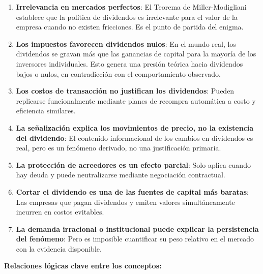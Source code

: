 \documentclass[12pt]{article}
\begin{document}
\begin{enumerate}
  \item \textbf{Irrelevancia en mercados perfectos}: El Teorema de Miller-Modigliani establece que la pol\'itica de dividendos es irrelevante para el valor de la empresa cuando no existen fricciones. Es el punto de partida del enigma.

  \item \textbf{Los impuestos favorecen dividendos nulos}: En el mundo real, los dividendos se gravan m\'as que las ganancias de capital para la mayor\'ia de los inversores individuales. Esto genera una presi\'on te\'orica hacia dividendos bajos o nulos, en contradicci\'on con el comportamiento observado.

  \item \textbf{Los costos de transacci\'on no justifican los dividendos}: Pueden replicarse funcionalmente mediante planes de recompra autom\'atica a costo y eficiencia similares.

  \item \textbf{La se\~nalizaci\'on explica los movimientos de precio, no la existencia del dividendo}: El contenido informacional de los cambios en dividendos es real, pero es un fen\'omeno derivado, no una justificaci\'on primaria.

  \item \textbf{La protecci\'on de acreedores es un efecto parcial}: Solo aplica cuando hay deuda y puede neutralizarse mediante negociaci\'on contractual.

  \item \textbf{Cortar el dividendo es una de las fuentes de capital m\'as baratas}: Las empresas que pagan dividendos y emiten valores simult\'aneamente incurren en costos evitables.

  \item \textbf{La demanda irracional o institucional puede explicar la persistencia del fen\'omeno}: Pero es imposible cuantificar su peso relativo en el mercado con la evidencia disponible.
\end{enumerate}

\bigskip
\noindent\textbf{Relaciones l\'ogicas clave entre los conceptos:}
\end{document}
